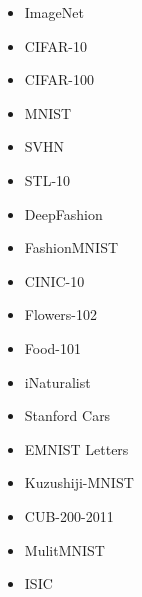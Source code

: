 \begin{itemize}
	\item ImageNet \autocite{imagenet.2019}
	\item CIFAR-10 \autocite{cifar.2012}
	\item CIFAR-100 \autocite{cifar.2012}
	\item MNIST \autocite{mnist.2010}
	\item SVHN \autocite{svhn.2011}
	\item STL-10 \autocite{stl.2011}	
	\item DeepFashion \autocite{clothing.2016}
	\item FashionMNIST \autocite{fashionMNIST.2017}
	\item CINIC-10 \autocite{Darlow.2018}
	\item Flowers-102 \autocite{flowers.2008} 
	\item Food-101 \autocite{food.2014}
	\item iNaturalist \autocite{vanHorn.2018}
	\item Stanford Cars \autocite{stanfordcars.2013}
	\item EMNIST Letters \autocite{emnistletters.2017}
	\item Kuzushiji-MNIST \autocite{kuzushijiMNIST.2018}
	\item CUB-200-2011 \autocite{cub.2011}
	\item MulitMNIST \autocite{Sabour.2017}
	\item ISIC \autocites{isic1.2019}{isic2.2018}{isic3.2018}
\end{itemize} 